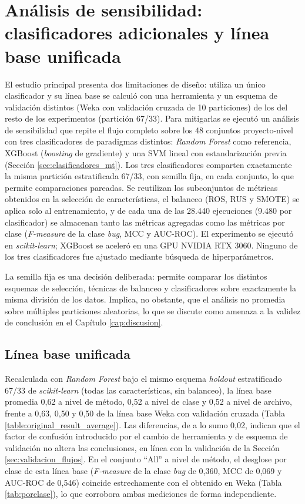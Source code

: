 \section{Análisis de sensibilidad: clasificadores adicionales y línea base unificada}
\label{sec:sensibilidad}

El estudio principal presenta dos limitaciones de diseño: utiliza un único clasificador y su línea base se calculó con una herramienta y un esquema de validación distintos (Weka con validación cruzada de 10 particiones) de los del resto de los experimentos (partición 67/33). Para mitigarlas se ejecutó un análisis de sensibilidad que repite el flujo completo sobre los 48 conjuntos proyecto-nivel con tres clasificadores de paradigmas distintos: \textit{Random Forest} como referencia, XGBoost \cite{chen2016} (\textit{boosting} de gradiente) y una SVM lineal \cite{cortes1995} con estandarización previa (Sección \ref{sec:clasificadores_mt}). Los tres clasificadores comparten exactamente la misma partición estratificada 67/33, con semilla fija, en cada conjunto, lo que permite comparaciones pareadas. Se reutilizan los subconjuntos de métricas obtenidos en la selección de características, el balanceo (ROS, RUS y SMOTE) se aplica solo al entrenamiento, y de cada una de las 28.440 ejecuciones (9.480 por clasificador) se almacenan tanto las métricas agregadas como las métricas por clase (\textit{F-measure} de la clase \textit{bug}, MCC y AUC-ROC). El experimento se ejecutó en \textit{scikit-learn}; XGBoost se aceleró en una GPU NVIDIA RTX 3060. Ninguno de los tres clasificadores fue ajustado mediante búsqueda de hiperparámetros.

La semilla fija es una decisión deliberada: permite comparar los distintos esquemas de selección, técnicas de balanceo y clasificadores sobre exactamente la misma división de los datos. Implica, no obstante, que el análisis no promedia sobre múltiples particiones aleatorias, lo que se discute como amenaza a la validez de conclusión en el Capítulo \ref{cap:discusion}.

\subsection{Línea base unificada}

Recalculada con \textit{Random Forest} bajo el mismo esquema \textit{holdout} estratificado 67/33 de \textit{scikit-learn} (todas las características, sin balanceo), la línea base promedia 0,62 a nivel de método, 0,52 a nivel de clase y 0,52 a nivel de archivo, frente a 0,63, 0,50 y 0,50 de la línea base Weka con validación cruzada (Tabla \ref{table:original_result_average}). Las diferencias, de a lo sumo 0,02, indican que el factor de confusión introducido por el cambio de herramienta y de esquema de validación no altera las conclusiones, en línea con la validación de la Sección \ref{sec:validacion_flujos}. En el conjunto ``All'' a nivel de método, el desglose por clase de esta línea base (\textit{F-measure} de la clase \textit{bug} de 0,360, MCC de 0,069 y AUC-ROC de 0,546) coincide estrechamente con el obtenido en Weka (Tabla \ref{tab:porclase}), lo que corrobora ambas mediciones de forma independiente.

